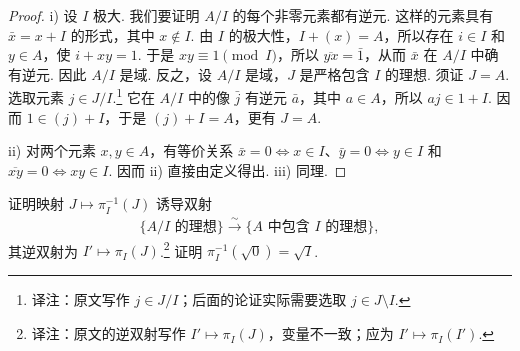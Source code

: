 \begin{proof}
i) 设 $I$ 极大. 我们要证明 $A/I$ 的每个非零元素都有逆元. 这样的元素具有 $\bar x=x+I$ 的形式，其中 $x\notin I$. 由 $I$ 的极大性，$I+(x)=A$，所以存在 $i\in I$ 和 $y\in A$，使 $i+xy=1$. 于是 $xy\equiv1\pmod I$，所以 $\overline{yx}=\bar1$，从而 $\bar x$ 在 $A/I$ 中确有逆元. 因此 $A/I$ 是域. 反之，设 $A/I$ 是域，$J$ 是严格包含 $I$ 的理想. 须证 $J=A$. 选取元素 $j\in J/I$.\footnote{译注：原文写作 $j\in J/I$；后面的论证实际需要选取 $j\in J\setminus I$.} 它在 $A/I$ 中的像 $\bar j$ 有逆元 $\bar a$，其中 $a\in A$，所以 $aj\in1+I$. 因而 $1\in(j)+I$，于是 $(j)+I=A$，更有 $J=A$.

 ii) 对两个元素 $x,y\in A$，有等价关系 $\bar x=0\Longleftrightarrow x\in I$、$\bar y=0\Longleftrightarrow y\in I$ 和 $\overline{xy}=0\Longleftrightarrow xy\in I$. 因而 ii) 直接由定义得出. iii) 同理.
\end{proof}
\begin{exercise*}
证明映射 $J\mapsto\pi_I^{-1}(J)$ 诱导双射
\begin{align*}
\{A/I\text{ 的理想}\}\xrightarrow{\sim}\{A\text{ 中包含 }I\text{ 的理想}\},
\end{align*}
其逆双射为 $I'\mapsto\pi_I(J)$.\footnote{译注：原文的逆双射写作 $I'\mapsto\pi_I(J)$，变量不一致；应为 $I'\mapsto\pi_I(I')$.} 证明 $\pi_I^{-1}(\sqrt0)=\sqrt I$.
\end{exercise*}



